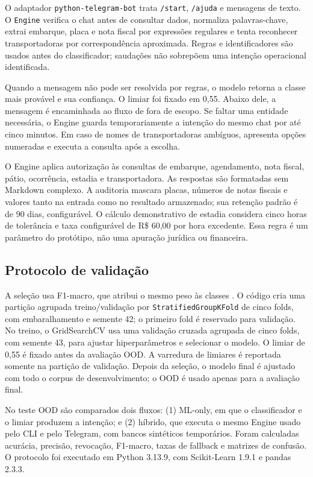 \documentclass[conference]{IEEEtran}
\begin{document}
O adaptador \texttt{python-telegram-bot} trata \texttt{/start}, \texttt{/ajuda} e mensagens de texto. O \texttt{Engine} verifica o chat antes de consultar dados, normaliza palavras-chave, extrai embarque, placa e nota fiscal por expressões regulares e tenta reconhecer transportadoras por correspondência aproximada. Regras e identificadores são usados antes do classificador; saudações não sobrepõem uma intenção operacional identificada.

Quando a mensagem não pode ser resolvida por regras, o modelo retorna a classe mais provável e sua confiança. O limiar foi fixado em 0,55. Abaixo dele, a mensagem é encaminhada ao fluxo de fora de escopo. Se faltar uma entidade necessária, o Engine guarda temporariamente a intenção do mesmo chat por até cinco minutos. Em caso de nomes de transportadoras ambíguos, apresenta opções numeradas e executa a consulta após a escolha.

O Engine aplica autorização às consultas de embarque, agendamento, nota fiscal, pátio, ocorrência, estadia e transportadora. As respostas são formatadas sem Markdown complexo. A auditoria mascara placas, números de notas fiscais e valores tanto na entrada como no resultado armazenado; sua retenção padrão é de 90 dias, configurável. O cálculo demonstrativo de estadia considera cinco horas de tolerância e taxa configurável de R\$ 60,00 por hora excedente. Essa regra é um parâmetro do protótipo, não uma apuração jurídica ou financeira.

\subsection{Protocolo de validação}

A seleção usa F1-macro, que atribui o mesmo peso às classes \cite{sokolova}. O código cria uma partição agrupada treino/validação por \texttt{StratifiedGroupKFold} de cinco folds, com embaralhamento e semente 42; o primeiro fold é reservado para validação. No treino, o GridSearchCV usa uma validação cruzada agrupada de cinco folds, com semente 43, para ajustar hiperparâmetros e selecionar o modelo. O limiar de 0,55 é fixado antes da avaliação OOD. A varredura de limiares é reportada somente na partição de validação. Depois da seleção, o modelo final é ajustado com todo o corpus de desenvolvimento; o OOD é usado apenas para a avaliação final.

No teste OOD são comparados dois fluxos: (1) ML-only, em que o classificador e o limiar produzem a intenção; e (2) híbrido, que executa o mesmo Engine usado pelo CLI e pelo Telegram, com bancos sintéticos temporários. Foram calculadas acurácia, precisão, revocação, F1-macro, taxas de fallback e matrizes de confusão. O protocolo foi executado em Python 3.13.9, com Scikit-Learn 1.9.1 e pandas 2.3.3.
\end{document}
